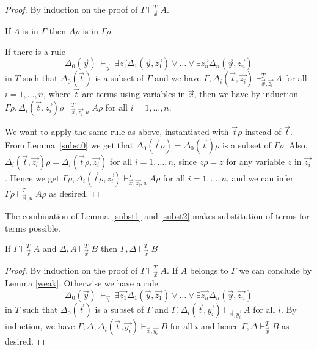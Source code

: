 \documentclass[10pt,a4paper]{article}
\begin{document}
\begin{proof}
By induction on the proof of $\Gamma\vdash_{\vec{x}}^T A$.

If $A$ is in $\Gamma$ then $A\rho$ is in $\Gamma\rho$.

If there is a rule
$$
\Delta_0(\vec{y})~\vdash_{\vec{y}}~
\exists \vec{z_1}\Delta_1(\vec{y},\vec{z_1})\vee\dots\vee\exists \vec{z_n}\Delta_n(\vec{y},\vec{z_n})
$$
in $T$ such that $\Delta_0(\vec{t})$ is a subset of $\Gamma$ and
we have $\Gamma,\Delta_i(\vec{t},\vec{z_i})\vdash^T_{\vec{x},\vec{z_i}} A$ for all $i = 1,\dots,n$,
where $\vec{t}$ are terms using variables in $\vec{x}$, then we have by induction
$\Gamma\rho,\Delta_i(\vec{t},\vec{z_i})\rho\vdash^T_{\vec{x},\vec{z_i},u} A\rho$
for all $i = 1,\dots,n$. 

We want to apply the same rule as above, instantiated
with $\vec{t}\rho$ instead of $\vec{t}$. From Lemma~\ref{subst0} we get that
$\Delta_0(\vec{t}\rho) = \Delta_0(\vec{t})\rho$ is a subset of $\Gamma\rho$.
Also, $\Delta_i(\vec{t},\vec{z_i})\rho = \Delta_i(\vec{t}\rho,\vec{z_i})$ 
for all $i = 1,\dots,n$, since $z\rho = z$ for any variable $z$ in $\vec{z_i}$.
Hence we get
$\Gamma\rho,\Delta_i(\vec{t}\rho,\vec{z_i})\vdash^T_{\vec{x},\vec{z_i},u} A\rho$ for all $i = 1,\dots,n$,
and we can infer $\Gamma\rho\vdash^T_{\vec{x},u} A\rho$ as desired.
\end{proof}

The combination of Lemma~\ref{subst1} and \ref{subst2} makes
substitution of terms for terms possible.

\begin{lemma}\label{cut}
If $\Gamma\vdash_{\vec{x}}^T A$ and $\Delta,A\vdash_{\vec{x}}^T B$ then
$\Gamma,\Delta\vdash_{\vec{x}}^T B$
\end{lemma}

\begin{proof}
By induction on the proof of $\Gamma\vdash_{\vec{x}}^T A$. If $A$ belongs to $\Gamma$ we can
conclude by Lemma \ref{weak}. 
Otherwise we have a rule
$$
\Delta_0(\vec{y})~\vdash_{\vec{y}}~
\exists \vec{z_1}\Delta_1(\vec{y},\vec{z_1})\vee\dots\vee\exists \vec{z_n}\Delta_n(\vec{y},\vec{z_n})
$$
in $T$ such that $\Delta_0(\vec{t})$ is a subset of $\Gamma$ and
$\Gamma,\Delta_i(\vec{t},\vec{y_i})\vdash_{\vec{x},\vec{y_i}} A$ for all $i$.
By induction, we have $\Gamma,\Delta,\Delta_i(\vec{t},\vec{y_i})\vdash_{\vec{x},\vec{y_i}} B$ for all $i$
and hence $\Gamma,\Delta\vdash_{\vec{x}}^T B$ as desired.
\end{proof}
\end{document}
